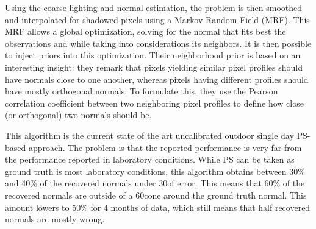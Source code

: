 Using the coarse lighting and normal estimation, the problem is then smoothed and interpolated for shadowed pixels using a Markov Random Field (MRF). This MRF allows a global optimization, solving for the normal that fits best the observations and while taking into considerations its neighbors. It is then possible to inject priors into this optimization. Their neighborhood prior is based on an interesting insight: they remark that pixels yielding similar pixel profiles should have normals close to one another, whereas pixels having different profiles should have mostly orthogonal normals. To formulate this, they use the Pearson correlation coefficient between two neighboring pixel profiles to define how close (or orthogonal) two normals should be.

This algorithm is the current state of the art uncalibrated outdoor single day PS-based approach. The problem is that the reported performance is very far from the performance reported in laboratory conditions. While PS can be taken as ground truth is most laboratory conditions, this algorithm obtains between 30\% and 40\% of the recovered normals under 30\degree of error. This means that 60\% of the recovered normals are outside of a 60\degree cone around the ground truth normal. This amount lowers to 50\% for 4 months of data, which still means that half recovered normals are mostly wrong.




